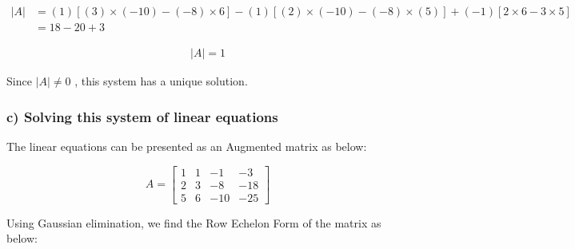 \documentclass[a4paper]{report}
\begin{document}
\begin{align*}
    |A| &= (1)[(3)\times(-10) - (-8)\times6]-(1)[(2)\times(-10)-(-8)\times(5)]+(-1)[2\times6-3\times5] \\
    &=18-20+3
\end{align*}

\begin{align}
    \boxed{|A|= 1}
\end{align}

Since $|A| \neq 0$ , this system has a unique solution. 

\subsubsection*{c) Solving this system of linear equations}

The linear equations can be presented as an Augmented matrix as below:


$$A=\left[\begin{array}{ccc|c}
1&1&-1& -3 \\
    2&3&-8&-18 \\
    5&6&-10&-25
\end{array}\right]$$
\vspace{2mm}

Using Gaussian elimination, we find the Row Echelon Form of the matrix as below:

\vspace{2mm}

\vspace{2mm}
\end{document}

